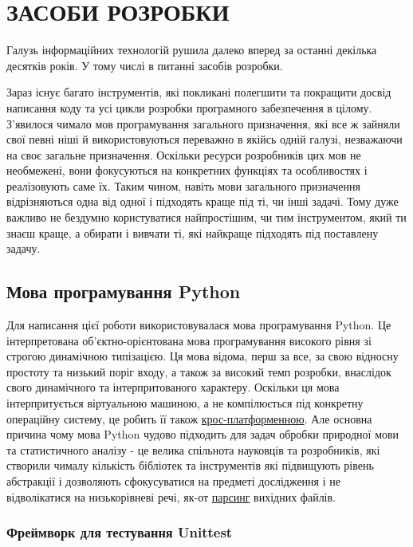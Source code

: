 \section{ЗАСОБИ РОЗРОБКИ}


Галузь інформаційних технологій рушила далеко вперед за останні декілька десятків років.
У тому числі в питанні засобів розробки. 


Зараз існує багато інструментів, які покликані
полегшити та покращити досвід написання коду та усі цикли розробки програмного забезпечення
в цілому. З'явилося чимало мов програмування загального призначення,
які все ж зайняли свої певні ніші й використовуються переважно в якійсь одній галузі,
незважаючи на своє загальне призначення. Оскільки ресурси розробників цих мов не необмежені,
вони фокусуються на конкретних функціях та особливостях і реалізовують саме їх. Таким чином,
навіть мови загального призначення відрізняються одна від одної і підходять краще під ті,
чи інші задачі. Тому дуже важливо не бездумно користуватися найпростішим, чи тим інструментом,
який ти знаєш краще, а обирати і вивчати ті, які найкраще підходять під поставлену задачу.

\subsection{Мова програмування Python}

Для написання цієї роботи використовувалася мова програмування Python. Це інтерпретована
об'єктно-орієнтована мова програмування високого рівня зі строгою динамічною типізацією.
Ця мова відома, перш за все, за свою відносну простоту та низький поріг входу,
а також за високий темп розробки, внаслідок свого динамічного та інтерпритованого характеру.
Оскільки ця мова інтерпритується віртуальною машиною, а не компілюється під конкретну
операційну систему, це робить її також \hyperlink{term1}{крос-платформенною}.
Але основна причина чому мова Python чудово підходить для задач обробки природної мови
та статистичного аналізу - це велика спільнота науковців та розробників, які створили чималу
кількість бібліотек та інструментів які підвищують рівень абстракції і дозволяють сфокусуватися
на предметі дослідження і не відволікатися на низькорівневі речі, як-от
\hyperlink{term2}{парсинг} вихідних файлів.

\subsubsection{Фреймворк для тестування Unittest}

